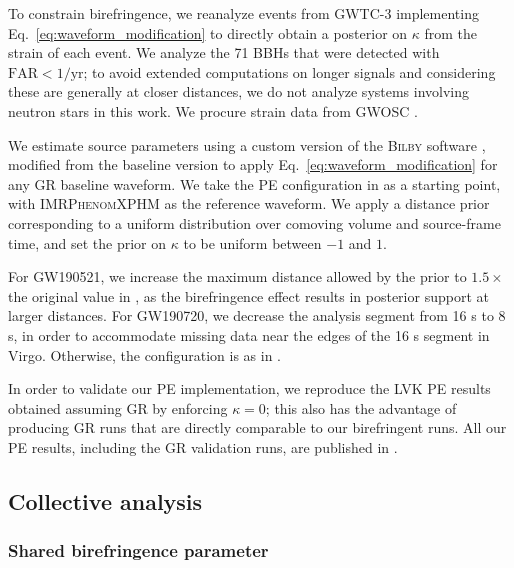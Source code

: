 \documentclass[aps,prd,twocolumn,superscriptaddress,preprintnumbers,floatfix,nofootinbib]{revtex4-2}
\begin{document}
To constrain birefringence, we reanalyze events from GWTC-3 \citep{GWTC-2.1, GWTC-3} implementing Eq.~\eqref{eq:waveform_modification} to directly obtain a posterior on $\kappa$ from the strain of each event.
We analyze the 71 \acp{BBH} that were detected with $\mathrm{FAR} < 1/\mathrm{yr}$; to avoid extended computations on longer signals and considering these are generally at closer distances, we do not analyze systems involving neutron stars in this work.
We procure strain data from \ac{GWOSC} \citep{GWOSC}.

We estimate source parameters using a custom version of the \textsc{Bilby} software \citep{Bilby}, modified from the baseline version to apply Eq.~\eqref{eq:waveform_modification} for any \ac{GR} baseline waveform.
We take the \ac{PE} configuration in \citep{GWTC-2.1, GWTC-3, GWTC-2.1_dataset, GWTC-3_dataset} as a starting point, with \textsc{IMRPhenomXPHM} \citep{Pratten:2020ceb} as the reference waveform.
We apply a distance prior corresponding to a uniform distribution over comoving volume and source-frame time, and set the prior on $\kappa$ to be uniform between $-1$ and $1$. 

For GW190521, we increase the maximum distance allowed by the prior to $1.5\times$ the original value in \cite{GWTC-2.1_dataset}, as the birefringence effect results in posterior support at larger distances.
For GW190720, we decrease the analysis segment from 16 s to 8 s, in order to accommodate missing data near the edges of the 16 s segment in Virgo.
Otherwise, the configuration is as in \citep{GWTC-2.1, GWTC-3, GWTC-2.1_dataset, GWTC-3_dataset}.

In order to validate our \ac{PE} implementation, we reproduce the \ac{LVK} \ac{PE} results obtained assuming \ac{GR} by enforcing $\kappa = 0$; this also has the advantage of producing \ac{GR} runs that are directly comparable to our birefringent runs.
All our \ac{PE} results, including the \ac{GR} validation runs, are published in \citet{dataset}.

\subsection{Collective analysis}

\subsubsection{Shared birefringence parameter}
\end{document}
